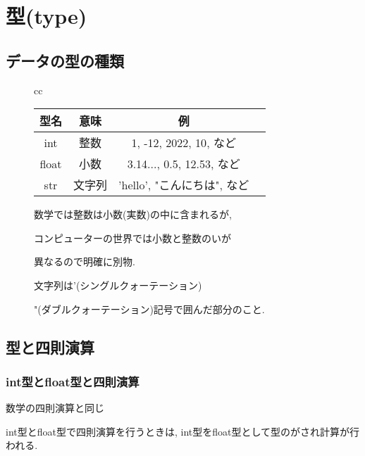 \documentclass{jsarticle}
\begin{document}
\section{型(type)}
\subsection{データの型の種類} \vspace{-5mm}
\begin{figure}[h]
	\begin{tabular}{cc}
		\begin{minipage}[c]{.5\textwidth}
			\begin{tabular}[t]{|c|c|c|c|}
				\hline
				型名  & 意味   & 例                           \\
				\hline \hline
				int   & 整数   & 1, -12, 2022, 10, など       \\ \hline
				float & 小数   & 3.14..., 0.5, 12.53, など    \\ \hline
				str   & 文字列 & 'hello',  "こんにちは", など \\ \hline
			\end{tabular}
		\end{minipage} \hspace{5mm}
		\begin{minipage}[c]{.6\textwidth}
			数学では整数は小数(実数)の中に含まれるが, \par コンピューターの世界では小数と整数のいが \par
			異なるので明確に別物.  \par
			文字列は'(シングルクォーテーション)  \par
			"(ダブルクォーテーション)記号で囲んだ部分のこと.
		\end{minipage}
	\end{tabular}
\end{figure}

\subsection{型と四則演算}
\subsubsection{int型とfloat型と四則演算}
数学の四則演算と同じ \par
int型とfloat型で四則演算を行うときは, int型をfloat型として型のがされ計算が行われる.
\end{document}
